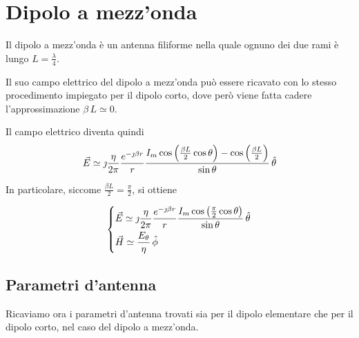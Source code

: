 \section{Dipolo a mezz'onda}

Il dipolo a mezz'onda è un antenna filiforme nella quale ognuno dei due rami è lungo $L = \frac{\lambda}{4}$.

Il suo campo elettrico del dipolo a mezz'onda può essere ricavato con lo stesso procedimento impiegato per il dipolo corto, dove però viene fatta cadere l'approssimazione $\beta \, L \simeq 0$.

Il campo elettrico diventa quindi
\begin{equation*}
	\vec{E}
	\simeq \jmath \frac{\eta}{2 \pi} \frac{e^{-\jmath \beta r}}{r} \frac{I_m \cos \left(\frac{\beta L}{2} \cos \theta \right) - \cos \left(\frac{\beta L}{2} \right)}{\sin \theta} \,\hat{\theta}
\end{equation*}

In particolare, siccome $\frac{\beta L}{2} = \frac{\pi}{2}$, si ottiene

\begin{equation}\begin{dcases}
	\vec{E} \simeq \jmath \frac{\eta}{2 \pi} \frac{e^{-\jmath \beta r}}{r} \frac{I_m \cos \left(\frac{\pi}{2} \cos \theta \right)}{\sin \theta} \,\hat{\theta} \\
	\vec{H} \simeq \frac{E_{\theta}}{\eta} \,\hat{\phi}
\end{dcases}\end{equation}

\subsection{Parametri d'antenna}
Ricaviamo ora i parametri d'antenna trovati sia per il dipolo elementare che per il dipolo corto, nel caso del dipolo a mezz'onda.

